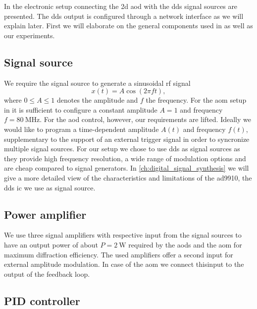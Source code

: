 In  the electronic setup connecting the \gls{2d}
\gls{aod} with the \gls{dds} signal sources are presented. The \gls{dds}
output is configured through a network interface as we will explain later.
First we will elaborate on the general components used in
 as well as our experiments.

\subsection{Signal source}\label{subsec:setup_signal_source}

We require the signal source to generate a sinusoidal \gls{rf} signal
\begin{equation}
  x(t)
  =A\cos\left(2\pi ft\right)
  \label{eq:signal},
\end{equation}
where $0\leq A\leq1$ denotes the amplitude and $f$ the frequency. For the
\gls{aom} setup in  it is sufficient to configure
a constant amplitude $A=1$ and frequency $f=\SI{80}{\mega\hertz}$. For the
\gls{aod} control, however, our requirements are lifted. Ideally we would
like to program a time-dependent amplitude $A(t)$ and frequency $f(t)$,
supplementary to the support of an external trigger signal in order to
syncronize multiple signal sources. For our setup we chose to use \gls{dds}
as signal sources as they provide high frequency resolution, a wide range of
modulation options and are cheap compared to signal generators. In
\cref{ch:digital_signal_synthesis} we will give a more detailed view of the
characteristics and limitations of the \gls{ad9910}, the \gls{dds} \gls{ic}
we use as signal source.

\subsection{Power amplifier}

We use three signal amplifiers with respective input from the signal sources
to have an output power of about $P=\SI{2}{\watt}$ required by the \gls{aod}s
and the \gls{aom} for maximum diffraction efficiency. The used amplifiers
offer a second input for external amplitude modulation. In case of the
\gls{aom} we connect thisinput to the output of the feedback loop.

\subsection{PID controller}

